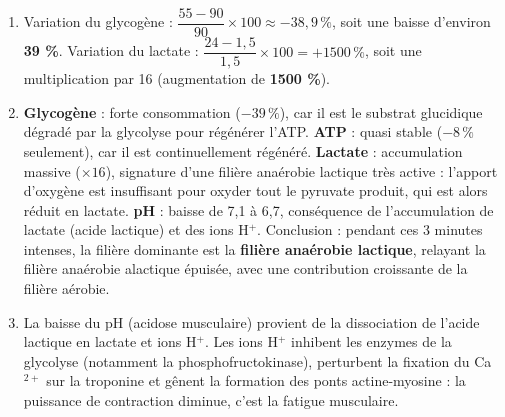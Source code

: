 \documentclass[11pt]{article}
\newcommand{\cle}[1]{{\popxbold\color{popdark}#1}}
\begin{document}
\begin{corrige}
\begin{enumerate}
\item Variation du glycogène : $\dfrac{55 - 90}{90} \times 100 \approx -38,9\,\%$, soit une baisse d'environ \textbf{39 \%}. Variation du lactate : $\dfrac{24 - 1,5}{1,5} \times 100 = +1500\,\%$, soit une multiplication par 16 (augmentation de \textbf{1500 \%}).
\item \textbf{Glycogène} : forte consommation ($-39\,\%$), car il est le substrat glucidique dégradé par la glycolyse pour régénérer l'ATP. \textbf{ATP} : quasi stable ($-8\,\%$ seulement), car il est continuellement régénéré. \textbf{Lactate} : accumulation massive ($\times 16$), signature d'une \cle{filière anaérobie lactique} très active : l'apport d'oxygène est insuffisant pour oxyder tout le pyruvate produit, qui est alors réduit en lactate. \textbf{pH} : baisse de 7,1 à 6,7, conséquence de l'accumulation de lactate (acide lactique) et des ions H$^+$. Conclusion : pendant ces 3 minutes intenses, la filière dominante est la \textbf{filière anaérobie lactique}, relayant la filière anaérobie alactique épuisée, avec une contribution croissante de la filière aérobie.
\item La baisse du pH (acidose musculaire) provient de la dissociation de l'acide lactique en lactate et ions H$^+$. Les ions H$^+$ inhibent les enzymes de la glycolyse (notamment la phosphofructokinase), perturbent la fixation du Ca$^{2+}$ sur la troponine et gênent la formation des ponts actine-myosine : la puissance de contraction diminue, c'est la \cle{fatigue musculaire}.
\end{enumerate}
\end{corrige}
\end{document}
